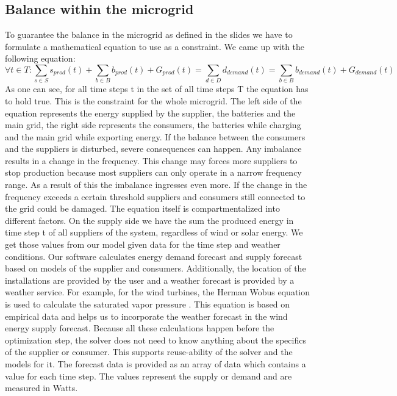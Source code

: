 \subsection{Balance within the microgrid}
To guarantee the balance in the microgrid as defined in the slides we have to formulate a mathematical equation to use as a constraint.
We came up with the following equation:\\
\begin{equation} \label{eq1:balance}
\forall t \in T: \sum_{s \in S}{s_{prod}(t)} + \sum_{b \in B}{b_{prod}(t)} + G_{prod}(t) = \sum_{d \in D}{d_{demand}(t)} = \sum_{b \in B}{b_{demand}(t)} + G_{demand}(t)
\end{equation}
As one can see, for all time steps t in the set of all time steps T the equation has to hold true. 
This is the constraint for the whole microgrid. The left side of the equation represents the energy supplied by the supplier, the batteries and the main grid, the right side represents the consumers, the batteries while charging and the main grid while exporting energy. If the balance between the consumers and the suppliers is disturbed, severe consequences can happen. Any imbalance results in a change in the frequency. This change may forces more suppliers to stop production because most suppliers can only operate in a narrow frequency range. As a result of this the imbalance ingresses even more. If the change in the frequency exceeds a certain threshold suppliers and consumers still connected to the grid could be damaged. 
The equation itself is compartmentalized into different factors.
On the supply side we have the sum the produced energy in time step t of all suppliers of the system, regardless of wind or solar energy.
We get those values from our model given data for the time step and weather conditions. Our software calculates energy demand forecast and supply forecast based on models of the supplier and consumers. Additionally, the location of the installations are provided by the user and a weather forecast is provided by a weather service. For example, for the wind turbines, the Herman Wobus equation is used to calculate the saturated vapor pressure \cite{NOAA}. This equation is based on empirical data and helps us to incorporate the weather forecast in the wind energy supply forecast. Because all these calculations happen before the optimization step, the solver does not need to know anything about the specifics of the supplier or consumer. This supports reuse-ability of the solver and the models for it. The forecast data is provided as an array of data which contains a value for each time step. The values represent the supply or demand and are measured in Watts. 
